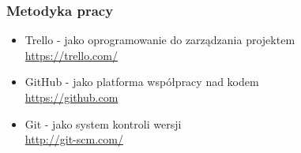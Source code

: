 \documentclass{beamer}
\begin{document}
\begin{frame}
\frametitle{Metodyka pracy}
\begin{itemize}
\item Trello - jako oprogramowanie do zarządzania projektem \\
  \href{https://trello.com/}{https://trello.com/}
\item GitHub - jako platforma współpracy nad kodem \\
  \href{https://github.com}{https://github.com}
\item Git - jako system kontroli wersji \\
  \href{http://git-scm.com/}{http://git-scm.com/}
\end{itemize}
\end{frame}
\end{document}
